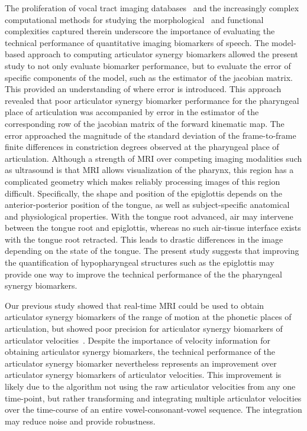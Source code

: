 \documentclass[preprint]{JASAnew}\usepackage[]{graphicx}\usepackage[]{color}
\begin{document}
The proliferation of vocal tract imaging databases~\citep{narayanan2014real,sorensen2017database} and the increasingly complex computational methods for studying the morphological~\citep{lammert2013morphological} and functional~\citep{dawson2016methods} complexities captured therein underscore the importance of evaluating the technical performance of quantitative imaging biomarkers of speech. The model-based approach to computing articulator synergy biomarkers allowed the present study to not only evaluate biomarker performance, but to evaluate the error of specific components of the model, such as the estimator of the jacobian matrix. This provided an understanding of where error is introduced. This approach revealed that poor articulator synergy biomarker performance for the pharyngeal place of articulation was accompanied by error in the estimator of the corresponding row of the jacobian matrix of the forward kinematic map. The error approached the magnitude of the standard deviation of the frame-to-frame finite differences in constriction degrees observed at the pharyngeal place of articulation. Although a strength of MRI over competing imaging modalities such as ultrasound is that MRI allows visualization of the pharynx, this region has a complicated geometry which makes reliably processing images of this region difficult. Specifically, the shape and position of the epiglottis depends on the anterior-posterior position of the tongue, as well as subject-specific anatomical and physiological properties. With the tongue root advanced, air may intervene between the tongue root and epiglottis, whereas no such air-tissue interface exists with the tongue root retracted. This leads to drastic differences in the image depending on the state of the tongue. The present study suggests that improving the quantification of hypopharyngeal structures such as the epiglottis may provide one way to improve the technical performance of the the pharyngeal synergy biomarkers.

Our previous study showed that real-time MRI could be used to obtain articulator synergy biomarkers of the range of motion at the phonetic places of articulation, but showed poor precision for articulator synergy biomarkers of articulator velocities~\citep{toger2017test}. Despite the importance of velocity information for obtaining articulator synergy biomarkers, the technical performance of the articulator synergy biomarker nevertheless represents an improvement over articulator synergy biomarkers of articulator velocities. This improvement is likely due to the algorithm not using the raw articulator velocities from any one time-point, but rather transforming and integrating multiple articulator velocities over the time-course of an entire vowel-consonant-vowel sequence. The integration may reduce noise and provide robustness. 
\end{document}
